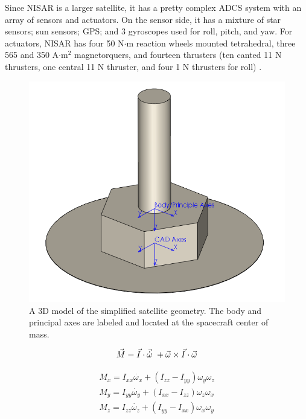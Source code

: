 Since NISAR is a larger satellite, it has a pretty complex ADCS system with an array of sensors and actuators. On the sensor side, it has a mixture of star sensors; sun sensors; GPS; and 3 gyroscopes used for roll, pitch, and yaw. For actuators, NISAR has four 50 N$\cdot$m reaction wheels mounted tetrahedral, three 565 and 350 A$\cdot$m$^2$ magnetorquers, and fourteen thrusters (ten canted 11 N thrusters, one central 11 N thruster, and four 1 N thrusters for roll) \cite{NisarMission}.



\begin{figure}[H]
\centering
\includegraphics[scale=0.7]{Images/WMAP_CAD4.PNG}
\caption{A 3D model of the simplified satellite geometry. The body and principal axes are labeled and located at the spacecraft center of mass.}
\label{CAD model with frames}
\end{figure}


\begin{equation}
\vec{M} = \vec{I} \cdot \vec{\dot{\omega}}\ + \vec{\omega} \times \vec{I} \cdot \vec{\omega} \\ 
\end{equation}   



\begin{eqnarray}
M_x = I_{xx} \dot{\omega_x} + (I_{zz} - I_{yy})\omega_y \omega_z \nonumber \\
M_y = I_{yy} \dot{\omega_y} + (I_{xx} - I_{zz})\omega_z \omega_x \\
M_z = I_{zz} \dot{\omega_z} + (I_{yy} - I_{xx})\omega_x \omega_y \nonumber
\end{eqnarray}

